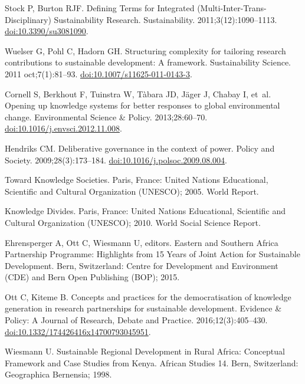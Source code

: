 \documentclass[10pt,a4paper]{article}
\begin{document}
\begin{multicols}{2}
\begin{footnotesize}
\begin{thebibliography}{10}
Stock P, Burton RJF.
\newblock Defining Terms for Integrated (Multi-Inter-Trans-Disciplinary)
  Sustainability Research.
\newblock Sustainability. 2011;3(12):1090--1113.
\newblock \href{https://doi.org/10.3390/su3081090}{doi:10.3390/su3081090}.

Wuelser G, Pohl C, Hadorn GH.
\newblock Structuring complexity for tailoring research contributions to
  sustainable development: A framework.
\newblock Sustainability Science. 2011 oct;7(1):81--93.
\newblock
  \href{https://doi.org/10.1007/s11625-011-0143-3}{doi:10.1007/s11625-011-0143-3}.

Cornell S, Berkhout F, Tuinstra W, T{\`{a}}bara JD, Jäger J, Chabay I, et~al.
\newblock Opening up knowledge systems for better responses to global
  environmental change.
\newblock Environmental Science {\&} Policy. 2013;28:60--70.
\newblock
  \href{https://doi.org/10.1016/j.envsci.2012.11.008}{doi:10.1016/j.envsci.2012.11.008}.

Hendriks CM.
\newblock Deliberative governance in the context of power.
\newblock Policy and Society. 2009;28(3):173--184.
\newblock
  \href{https://doi.org/10.1016/j.polsoc.2009.08.004}{doi:10.1016/j.polsoc.2009.08.004}.

Toward Knowledge Societies.
\newblock Paris, France: United Nations Educational, Scientific and Cultural
  Organization (UNESCO); 2005. World Report.

Knowledge Divides.
\newblock Paris, France: United Nations Educational, Scientific and Cultural
  Organization (UNESCO); 2010. World Social Science Report.

Ehrensperger A, Ott C, Wiesmann U, editors.
\newblock Eastern and Southern Africa Partnership Programme: Highlights from 15
  Years of Joint Action for Sustainable Development.
\newblock Bern, Switzerland: Centre for Development and Environment (CDE) and
  Bern Open Publishing (BOP); 2015.

Ott C, Kiteme B.
\newblock Concepts and practices for the democratisation of knowledge
  generation in research partnerships for sustainable development.
\newblock Evidence {\&} Policy: A Journal of Research, Debate and Practice.
  2016;12(3):405--430.
\newblock
  \href{https://doi.org/10.1332/174426416x14700793045951}{doi:10.1332/174426416x14700793045951}.

Wiesmann U.
\newblock Sustainable Regional Development in Rural Africa: Conceptual
  Framework and Case Studies from Kenya.
\newblock African Studies 14. Bern, Switzerland: Geographica Bernensia; 1998.


\end{thebibliography}
\end{footnotesize}
\end{multicols}
\end{document}
